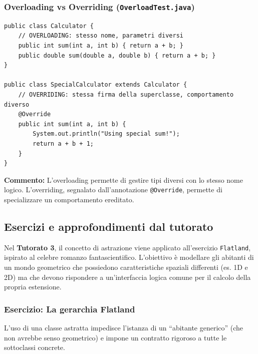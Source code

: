 \documentclass[12pt, a4paper]{article}
\begin{document}
\subsubsection{Overloading vs Overriding (\texttt{OverloadTest.java})}
\begin{verbatim}
public class Calculator {
    // OVERLOADING: stesso nome, parametri diversi
    public int sum(int a, int b) { return a + b; }
    public double sum(double a, double b) { return a + b; }
}

public class SpecialCalculator extends Calculator {
    // OVERRIDING: stessa firma della superclasse, comportamento diverso
    @Override
    public int sum(int a, int b) {
        System.out.println("Using special sum!");
        return a + b + 1;
    }
}
\end{verbatim}
\textbf{Commento:} L'overloading permette di gestire tipi diversi con lo stesso nome logico. L'overriding, segnalato dall'annotazione \texttt{@Override}, permette di specializzare un comportamento ereditato.

\newpage

\subsection{Esercizi e approfondimenti dal tutorato}
Nel \textbf{Tutorato 3}, il concetto di astrazione viene applicato all'esercizio \texttt{Flatland}, ispirato al celebre romanzo fantascientifico. L'obiettivo è modellare gli abitanti di un mondo geometrico che possiedono caratteristiche spaziali differenti (es. 1D e 2D) ma che devono rispondere a un'interfaccia logica comune per il calcolo della propria estensione.

\subsubsection{Esercizio: La gerarchia Flatland}
L'uso di una classe astratta impedisce l'istanza di un ``abitante generico'' (che non avrebbe senso geometrico) e impone un contratto rigoroso a tutte le sottoclassi concrete.
\end{document}
